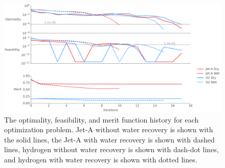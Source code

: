 \documentclass[conf]{new-aiaa}
\begin{document}
\begin{figure}[hbt!]
    \centering
    \includegraphics[width=1.0\textwidth]{opt_summary.pdf}
    \caption{The optimality, feasibility, and merit function history for each optimization problem.
        Jet-A without water recovery is shown with the solid lines, the Jet-A with water recovery is shown with dashed lines, hydrogen without water recovery is shown with dash-dot lines, and hydrogen with water recovery is shown with dotted lines.}
    \label{fig:history_summary}
\end{figure}

\end{document}
